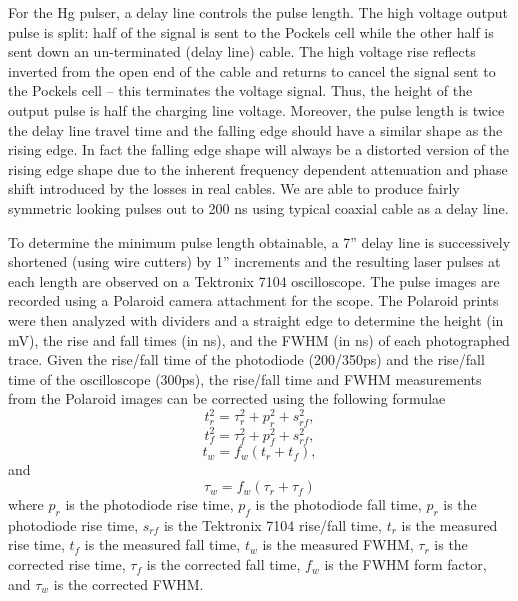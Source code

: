 For the Hg pulser, a delay line controls the pulse length. The high voltage output pulse is split: half of the signal is sent to the Pockels cell while the other half is sent down an un-terminated (delay line) cable. The high voltage rise reflects inverted from the open end of the cable and returns to cancel the signal sent to the Pockels cell -- this terminates the voltage signal. Thus, the height of the output pulse is half the charging line voltage. Moreover, the pulse length is twice the delay line travel time and the falling edge should have a similar shape as the rising edge. In fact the falling edge shape will always be a distorted version of the rising edge shape due to the inherent frequency dependent attenuation and phase shift introduced by the losses in real cables. We are able to produce fairly symmetric looking pulses out to 200 ns using typical coaxial cable as a delay line.

To determine the minimum pulse length obtainable, a 7'' delay line is successively shortened (using wire cutters) by 1'' increments and the resulting laser pulses at each length are observed on a Tektronix 7104 oscilloscope. The pulse images are recorded using a Polaroid camera attachment for the scope. The Polaroid prints were then analyzed with dividers and a straight edge to determine the height (in mV), the rise and fall times (in ns), and the FWHM (in ns) of each photographed trace. Given the rise/fall time of the photodiode (200/350ps) and the rise/fall time of the oscilloscope (300ps), the rise/fall time and FWHM measurements from the Polaroid images can be corrected using the following formulae
\begin{equation}
t_{r}^2
=
\tau_{r}^2
+
p_{r}^2
+
s_{rf}^2,
\end{equation}
\begin{equation}
t_{f}^2
=
\tau_{f}^2
+
p_{f}^2
+
s_{rf}^2,
\end{equation}
\begin{equation}
t_{w}
=
f_{w}
(t_{r} + t_{f}),
\end{equation}
and
\begin{equation}
\tau_{w}
=
f_{w}
(\tau_{r} + \tau_{f})
\end{equation}
where $p_{r}$ is the photodiode rise time, $p_{f}$ is the photodiode fall time, $p_{r}$ is the photodiode rise time, $s_{rf}$ is the Tektronix 7104 rise/fall time, $t_{r}$ is the measured rise time, $t_{f}$ is the measured fall time, $t_{w}$ is the measured FWHM, $\tau_{r}$ is the corrected rise time, $\tau_{f}$ is the corrected fall time, $f_{w}$ is the FWHM form factor, and $\tau_{w}$ is the corrected FWHM.

